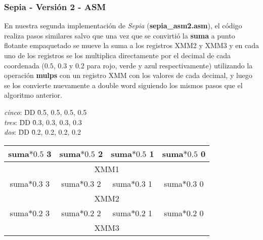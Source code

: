 \subsubsection{Sepia - Versión 2 - ASM}

En nuestra segunda implementación de \textit{Sepia} (\textbf{sepia_asm2.asm}), el código realiza pasos similares salvo que una vez que se convirtió la \textbf{suma} a punto flotante empaquetado se mueve la suma a los registros XMM2 y XMM3 y en cada uno de los registros se los multiplica directamente por el decimal de cada coordenada ($0.5$, $0.3$ y $0.2$ para rojo, verde y azul respectivamente) utilizando la operación \textbf{mulps} con un registro XMM con los valores de cada decimal, y luego se los convierte nuevamente a double word siguiendo los mismos pasos que el algoritmo anterior.

\begin{tabbing}
	\textit{cinco}: \= DD \= 0.5, 0.5, 0.5, 0.5 \\
	\textit{tres}:  \= DD \= 0.3, 0.3, 0.3, 0.3 \\
	\textit{dos}:   \= DD \= 0.2, 0.2, 0.2, 0.2 \\
\end{tabbing}

\begin{table}[!h]
	\centering
	\begin{tabular}{| c | c | c | c |}
		\hline
		suma$*0.5$ 3 & suma$*0.5$ 2 & suma$*0.5$ 1 & suma$*0.5$ 0  \\ \hline
		\multicolumn{4}{c}{XMM1} \\
		\hline
		suma$*0.3$ 3 & suma$*0.3$ 2 & suma$*0.3$ 1 & suma$*0.3$ 0  \\ \hline
		\multicolumn{4}{c}{XMM2} \\
		\hline
		suma$*0.2$ 3 & suma$*0.2$ 2 & suma$*0.2$ 1 & suma$*0.2$ 0  \\ 
		\hline
		\multicolumn{4}{c}{XMM3}
	\end{tabular}
\end{table}